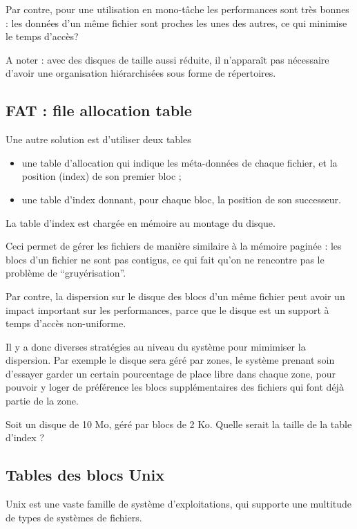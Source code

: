 \begin{multicols}{2}
Par contre, pour une utilisation en mono-tâche les performances
sont très bonnes : les données d'un même fichier sont proches les unes des
autres, ce qui minimise le temps d'accès?

A noter : avec des disques de taille aussi réduite, il n'apparaît pas nécessaire
d'avoir une organisation hiérarchisées sous forme de répertoires.


\subsection{FAT : file allocation table}

Une autre solution est d'utiliser deux tables
\begin{itemize}
\item une table d'allocation qui indique les méta-données de chaque fichier, 
et la position (index) de son premier bloc ;
\item une table d'index donnant, pour chaque bloc, la position de son 
successeur.
\end{itemize}

La table d'index est chargée en mémoire au montage du disque.


Ceci permet de gérer les fichiers de manière similaire à la mémoire
paginée : les blocs d'un fichier ne sont pas contigus, ce qui fait
qu'on ne rencontre pas le problème de ``gruyérisation''.

Par contre, la dispersion sur le disque des blocs d'un même fichier
peut avoir un impact important sur les performances, parce que le
disque est un support à temps d'accès non-uniforme.

Il y a donc diverses stratégies au niveau du système pour mimimiser la
dispersion. Par exemple le disque sera géré par zones, le système
prenant soin d'essayer garder un certain pourcentage de place libre
dans chaque zone, pour pouvoir y loger de préférence les blocs
supplémentaires des fichiers qui font déjà partie de la zone.

\begin{exercice}
Soit un disque de 10 Mo, géré par blocs de 2 Ko. Quelle serait la
taille de la table d'index ?
\end{exercice}




\subsection{Tables des blocs Unix}

Unix est une vaste famille de système d'exploitations, qui supporte
une multitude de types de systèmes de fichiers.


\end{multicols}
